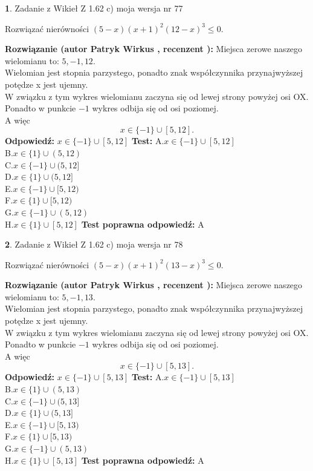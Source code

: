 \documentclass[12pt, a4paper]{article}
\theoremstyle{definition} %
\newtheorem{zad}{}
\newcommand{\zadStart}[1]{\begin{zad}#1\newline}
\newcommand{\zadStop}{\end{zad}}
\newcommand{\rozwStart}[2]{\noindent \textbf{Rozwiązanie (autor #1 , recenzent #2): }\newline}
\newcommand{\rozwStop}{\newline}
\newcommand{\odpStart}{\noindent \textbf{Odpowiedź:}\newline}
\newcommand{\odpStop}{\newline}
\newcommand{\testStart}{\noindent \textbf{Test:}\newline}
\newcommand{\testStop}{\newline}
\newcommand{\kluczStart}{\noindent \textbf{Test poprawna odpowiedź:}\newline}
\newcommand{\kluczStop}{\newline}
\begin{document}
\zadStart{Zadanie z Wikieł Z 1.62 c) moja wersja nr 77}

Rozwiązać nierówności $(5-x)(x+1)^{2}(12-x)^{3}\le0$.
\zadStop
\rozwStart{Patryk Wirkus}{}
Miejsca zerowe naszego wielomianu to: $5, -1, 12$.\\
Wielomian jest stopnia parzystego, ponadto znak współczynnika przy\linebreak najwyższej potędze x jest ujemny.\\ W związku z tym wykres wielomianu zaczyna się od lewej strony powyżej osi OX.\\
Ponadto w punkcie $-1$ wykres odbija się od osi poziomej.\\
A więc $$x \in \{-1\} \cup [5,12].$$
\rozwStop
\odpStart
$x \in \{-1\} \cup [5,12]$
\odpStop
\testStart
A.$x \in \{-1\} \cup [5,12]$\\
B.$x \in \{1\} \cup (5,12)$\\
C.$x \in \{-1\} \cup (5,12]$\\
D.$x \in \{1\} \cup (5,12]$\\
E.$x \in \{-1\} \cup [5,12)$\\
F.$x \in \{1\} \cup [5,12)$\\
G.$x \in \{-1\} \cup (5,12)$\\
H.$x \in \{1\} \cup [5,12]$
\testStop
\kluczStart
A
\kluczStop



\zadStart{Zadanie z Wikieł Z 1.62 c) moja wersja nr 78}

Rozwiązać nierówności $(5-x)(x+1)^{2}(13-x)^{3}\le0$.
\zadStop
\rozwStart{Patryk Wirkus}{}
Miejsca zerowe naszego wielomianu to: $5, -1, 13$.\\
Wielomian jest stopnia parzystego, ponadto znak współczynnika przy\linebreak najwyższej potędze x jest ujemny.\\ W związku z tym wykres wielomianu zaczyna się od lewej strony powyżej osi OX.\\
Ponadto w punkcie $-1$ wykres odbija się od osi poziomej.\\
A więc $$x \in \{-1\} \cup [5,13].$$
\rozwStop
\odpStart
$x \in \{-1\} \cup [5,13]$
\odpStop
\testStart
A.$x \in \{-1\} \cup [5,13]$\\
B.$x \in \{1\} \cup (5,13)$\\
C.$x \in \{-1\} \cup (5,13]$\\
D.$x \in \{1\} \cup (5,13]$\\
E.$x \in \{-1\} \cup [5,13)$\\
F.$x \in \{1\} \cup [5,13)$\\
G.$x \in \{-1\} \cup (5,13)$\\
H.$x \in \{1\} \cup [5,13]$
\testStop
\kluczStart
A
\kluczStop
\end{document}
